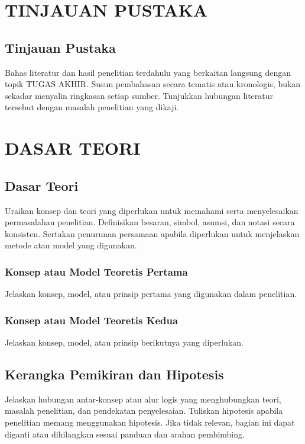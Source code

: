 \documentclass[skripsi]{ugmskripsi}
\begin{document}
\chapter{TINJAUAN PUSTAKA}

\section{Tinjauan Pustaka}
Bahas literatur dan hasil penelitian terdahulu yang berkaitan langsung dengan
topik TUGAS AKHIR. Susun pembahasan secara tematis atau kronologis, bukan sekadar
menyalin ringkasan setiap sumber. Tunjukkan hubungan literatur tersebut
dengan masalah penelitian yang dikaji.

\chapter{DASAR TEORI}

\section{Dasar Teori}
Uraikan konsep dan teori yang diperlukan untuk memahami serta menyelesaikan
permasalahan penelitian. Definisikan besaran, simbol, asumsi, dan notasi
secara konsisten. Sertakan penurunan persamaan apabila diperlukan untuk
menjelaskan metode atau model yang digunakan.

\subsection{Konsep atau Model Teoretis Pertama}
Jelaskan konsep, model, atau prinsip pertama yang digunakan dalam penelitian.

\subsection{Konsep atau Model Teoretis Kedua}
Jelaskan konsep, model, atau prinsip berikutnya yang diperlukan.

\section{Kerangka Pemikiran dan Hipotesis}
Jelaskan hubungan antar-konsep atau alur logis yang menghubungkan teori,
masalah penelitian, dan pendekatan penyelesaian. Tuliskan hipotesis apabila
penelitian memang menggunakan hipotesis. Jika tidak relevan, bagian ini dapat
diganti atau dihilangkan sesuai panduan dan arahan pembimbing.
\end{document}
